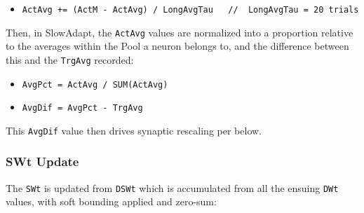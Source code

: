 \documentclass[11pt,twoside]{article}
\newif\myifpdf
\begin{document}
\begin{itemize}
\tightlist
\item
  \texttt{ActAvg\ +=\ (ActM\ -\ ActAvg)\ /\ LongAvgTau\ \ \ //\ \ LongAvgTau\ =\ 20\ trials}
\end{itemize}

Then, in SlowAdapt, the \texttt{ActAvg} values are normalized into a
proportion relative to the averages within the Pool a neuron belongs to,
and the difference between this and the \texttt{TrgAvg} recorded:

\begin{itemize}
\tightlist
\item
  \texttt{AvgPct\ =\ ActAvg\ /\ SUM(ActAvg)}
\item
  \texttt{AvgDif\ =\ AvgPct\ -\ TrgAvg}
\end{itemize}

This \texttt{AvgDif} value then drives synaptic rescaling per below.

\hypertarget{swt-update}{%
\subsubsection{SWt Update}\label{swt-update}}

The \texttt{SWt} is updated from \texttt{DSWt} which is accumulated from
all the ensuing \texttt{DWt} values, with soft bounding applied and
zero-sum:

\begin{Shaded}
\begin{Highlighting}[]
    \OperatorTok{\textgreater{}=}  \OperatorTok{\{}
\OperatorTok{*=} \OperatorTok{(}\OperatorTok{{-}}\OperatorTok{)}
    \OperatorTok{\}}  \OperatorTok{\{}
\OperatorTok{*=} \OperatorTok{(}\OperatorTok{{-}}\OperatorTok{)}
    \OperatorTok{\}}
\OperatorTok{+=}\OperatorTok{*} \OperatorTok{(}\OperatorTok{{-}}\OperatorTok{(}\OperatorTok{)} 
\OperatorTok{=}\OperatorTok{(}\OperatorTok{/}\OperatorTok{)}   
\end{Highlighting}
\end{Shaded}
\end{document}
